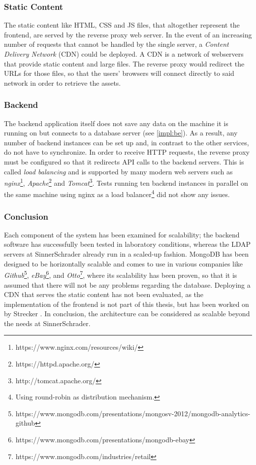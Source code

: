 \subsubsection{Static Content}
The static content like HTML, CSS and JS files, that altogether represent the frontend, are
served by the reverse proxy web server. In the event of an increasing number of requests that cannot be handled by the single server, a \textit{Content Delivery Network} (CDN) could be deployed. A CDN is a network of webservers that provide static content and large files. The reverse proxy would redirect the URLs for those files, so that the users' browsers will connect directly to said network in order to retrieve the assets.

\subsubsection{Backend}
The backend application itself does not save any data on the machine it is running on but connects to a database server (see \ref{impl:be}). As a result, any number of backend instances can be set up and, in contrast to the other services, do not have to synchronize. In order to receive HTTP requests, the reverse proxy must be configured so that it redirects API calls to the backend servers. This is called \textit{load balancing} and is supported by many modern web servers such as \textit{nginx}\footnote{https://www.nginx.com/resources/wiki/}, \textit{Apache}\footnote{https://httpd.apache.org/} and \textit{Tomcat}\footnote{http://tomcat.apache.org/}. Tests running ten backend instances in parallel on the same machine using nginx as a load balancer\footnote{Using round-robin as distribution mechanism.} did not show any issues.

\newpage

\subsubsection{Conclusion}
Each component of the system has been examined for scalability; the backend software has successfully been tested in laboratory conditions, whereas the LDAP servers at SinnerSchrader already run in a scaled-up fashion. MongoDB has been designed to be horizontally scalable and comes to use in various companies like
\textit{Github}\footnote{https://www.mongodb.com/presentations/mongosv-2012/mongodb-analytics-github},
\textit{eBay}\footnote{https://www.mongodb.com/presentations/mongodb-ebay}, and
\textit{Otto}\footnote{https://www.mongodb.com/industries/retail}, where its scalability has been proven, so that it is assumed that there will not be any problems regarding the database.
Deploying a CDN that serves the static content has not been evaluated, as the implementation of the frontend is not part of this thesis, but has been worked on by Strecker \cite{strecker}. In conclusion, the architecture can be considered as scalable beyond the needs at SinnerSchrader.


